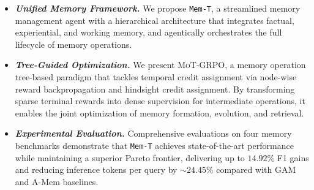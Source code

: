 \documentclass[11pt, a4paper]{lumia}
\newcommand{\ourmethod}{{\texttt{Mem-T}}\xspace} %
\newcommand{\ourtrain}{{\textsc{MoT-GRPO}}\xspace} %
\begin{document}
\begin{itemize}[leftmargin=*,itemsep=-0em]
    \item \textbf{\textit{Unified Memory Framework.}} We propose \ourmethod, a streamlined memory management agent with a hierarchical architecture that integrates factual, experiential, and working memory, and agentically orchestrates the full lifecycle of memory operations.
    \item \textbf{\textit{Tree-Guided Optimization.}} We present \ourtrain, a memory operation tree-based paradigm that tackles temporal credit assignment via node-wise reward backpropagation and hindsight credit assignment. By transforming sparse terminal rewards into dense supervision for intermediate operations, it enables the joint optimization of memory formation, evolution, and retrieval.
    \item \textbf{\textit{Experimental Evaluation.}} Comprehensive evaluations on four memory benchmarks demonstrate that \ourmethod achieves state-of-the-art performance while maintaining a superior Pareto frontier, delivering up to $14.92\%$ F1 gains and reducing inference tokens per query by $\sim24.45\%$ compared with GAM and A-Mem baselines.

\end{itemize}
\end{document}
